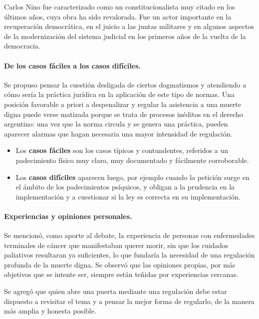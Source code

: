 \documentclass[12pt,oneside]{book}
\begin{document}
\begin{note}
Carlos Nino fue caracterizado como un constitucionalista muy citado en los últimos años, cuya obra ha sido revalorada. Fue un actor importante en la recuperación democrática, en el juicio a las juntas militares y en algunos aspectos de la modernización del sistema judicial en los primeros años de la vuelta de la democracia.
\end{note}

\paragraph{De los casos fáciles a los casos difíciles.} Se propuso pensar la cuestión desligada de ciertos dogmatismos y atendiendo a cómo sería la práctica jurídica en la aplicación de este tipo de normas. Una posición favorable a priori a despenalizar y regular la asistencia a una muerte digna puede verse matizada porque se trata de procesos inéditos en el derecho argentino: una vez que la norma circula y se genera una práctica, pueden aparecer alarmas que hagan necesaria una mayor intensidad de regulación.

\begin{itemize}
    \item Los \textbf{casos fáciles} son los casos típicos y contundentes, referidos a un padecimiento físico muy claro, muy documentado y fácilmente corroborable.
    \item Los \textbf{casos difíciles} aparecen luego, por ejemplo cuando la petición surge en el ámbito de los padecimientos psíquicos, y obligan a la prudencia en la implementación y a cuestionar si la ley es correcta en su implementación.
\end{itemize}

\paragraph{Experiencias y opiniones personales.} Se mencionó, como aporte al debate, la experiencia de personas con enfermedades terminales de cáncer que manifestaban querer morir, sin que los cuidados paliativos resultaran ya suficientes, lo que fundaría la necesidad de una regulación profunda de la muerte digna. Se observó que las opiniones propias, por más objetivos que se intente ser, siempre están teñidas por experiencias cercanas.

Se agregó que quien abre una puerta mediante una regulación debe estar dispuesto a revisitar el tema y a pensar la mejor forma de regularlo, de la manera más amplia y honesta posible.
\end{document}
